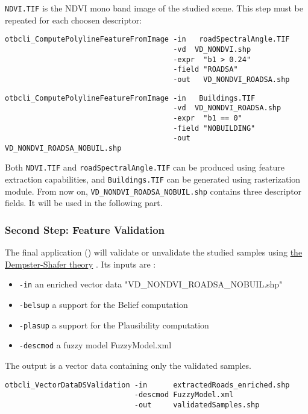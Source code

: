 \verb?NDVI.TIF? is the NDVI mono band image of the studied scene.
This step must be repeated for each choosen descriptor:

\begin{verbatim}
otbcli_ComputePolylineFeatureFromImage -in   roadSpectralAngle.TIF
                                       -vd  VD_NONDVI.shp
                                       -expr  "b1 > 0.24"
                                       -field "ROADSA"
                                       -out   VD_NONDVI_ROADSA.shp
\end{verbatim}

\begin{verbatim}
otbcli_ComputePolylineFeatureFromImage -in   Buildings.TIF
                                       -vd  VD_NONDVI_ROADSA.shp
                                       -expr  "b1 == 0"
                                       -field "NOBUILDING"
                                       -out   VD_NONDVI_ROADSA_NOBUIL.shp
\end{verbatim}

Both \verb?NDVI.TIF? and \verb?roadSpectralAngle.TIF? can be produced
using \mont feature extraction capabilities, and \verb?Buildings.TIF?
can be generated using \mont rasterization module. From now on,
\verb?VD_NONDVI_ROADSA_NOBUIL.shp? contains three descriptor fields.
It will be used in the following part.

\subsubsection{Second Step: Feature Validation}

The final application () will
validate or unvalidate the studied samples using
\href{http://en.wikipedia.org/wiki/Dempster\%E2\%80\%93Shafer_theory}{the Dempster-Shafer theory}
. Its inputs are :
\begin{itemize}
\item \verb?-in? an enriched vector data "VD\_NONDVI\_ROADSA\_NOBUIL.shp"
\item \verb?-belsup? a support for the Belief computation
\item \verb?-plasup? a support for the Plausibility computation
\item \verb?-descmod? a fuzzy model FuzzyModel.xml
\end{itemize}
The output is a vector data containing only the validated samples.

\begin{verbatim}
otbcli_VectorDataDSValidation -in      extractedRoads_enriched.shp
                              -descmod FuzzyModel.xml
                              -out     validatedSamples.shp
\end{verbatim}
